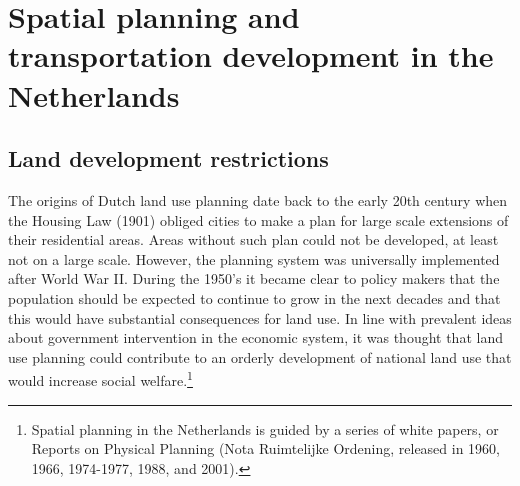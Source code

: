 \documentclass[a4paper,authoryear,review]{elsarticle}  	%
\begin{document}
	
\section[Spatial planning in the Netherlands]{Spatial planning and transportation development in the Netherlands}
\subsection{Land development restrictions}
	The origins of Dutch land use planning date back to the early 20th century when the Housing Law (1901) obliged cities to make a plan for large scale extensions of their residential areas. Areas without such plan could not be developed, at least not on a large scale. However, the planning system was universally implemented after World War II. During the 1950’s it became clear to policy makers that the population should be expected to continue to grow in the next decades and that this would have substantial consequences for land use. In line with prevalent ideas about government intervention in the economic system, it was thought that land use planning could contribute to an orderly development of national land use that would increase social welfare.\footnote{Spatial planning in the Netherlands is guided by a series of white papers, or Reports on Physical Planning (Nota Ruimtelijke Ordening, released in 1960, 1966, 1974-1977, 1988, and 2001).}
	
\end{document}
